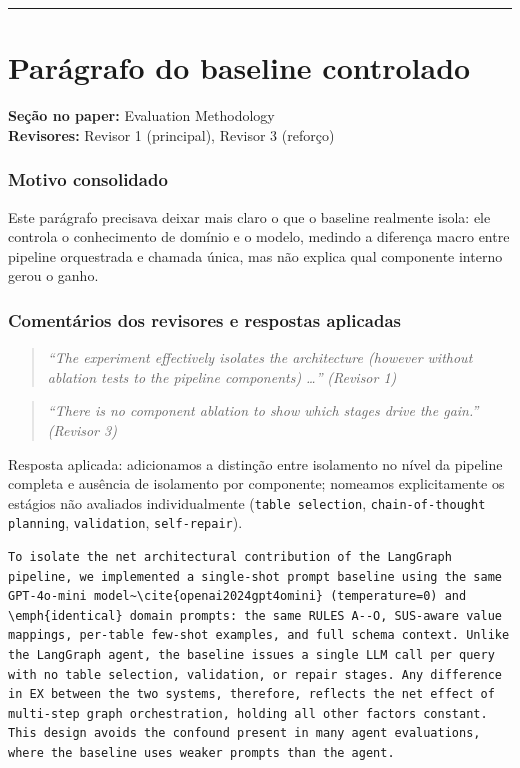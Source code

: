 \documentclass[11pt,a4paper]{article}
\begin{document}
\bigskip\hrule\bigskip

\section{Parágrafo do baseline controlado}

\textbf{Seção no paper:} Evaluation Methodology\\
\textbf{Revisores:} Revisor 1 (principal), Revisor 3 (reforço)

\subsubsection*{Motivo consolidado}

Este parágrafo precisava deixar mais claro o que o baseline realmente isola: ele controla o conhecimento de domínio e o modelo, medindo a diferença macro entre pipeline orquestrada e chamada única, mas não explica qual componente interno gerou o ganho.

\subsubsection*{Comentários dos revisores e respostas aplicadas}

\begin{quote}
\textit{``The experiment effectively isolates the architecture (however without ablation tests to the pipeline components) \ldots''}
\hfill\textit{(Revisor 1)}
\end{quote}

\begin{quote}
\textit{``There is no component ablation to show which stages drive the gain.''}
\hfill\textit{(Revisor 3)}
\end{quote}

\noindent Resposta aplicada: adicionamos a distinção entre isolamento no nível da pipeline completa e ausência de isolamento por componente; nomeamos explicitamente os estágios não avaliados individualmente (\texttt{table selection}, \texttt{chain-of-thought planning}, \texttt{validation}, \texttt{self-repair}).

\begin{originalblock}
\begin{lstlisting}[style=texsnippet]
To isolate the net architectural contribution of the LangGraph pipeline, we implemented a single-shot prompt baseline using the same GPT-4o-mini model~\cite{openai2024gpt4omini} (temperature=0) and \emph{identical} domain prompts: the same RULES A--O, SUS-aware value mappings, per-table few-shot examples, and full schema context. Unlike the LangGraph agent, the baseline issues a single LLM call per query with no table selection, validation, or repair stages. Any difference in EX between the two systems, therefore, reflects the net effect of multi-step graph orchestration, holding all other factors constant. This design avoids the confound present in many agent evaluations, where the baseline uses weaker prompts than the agent.
\end{lstlisting}
\end{originalblock}
\end{document}
